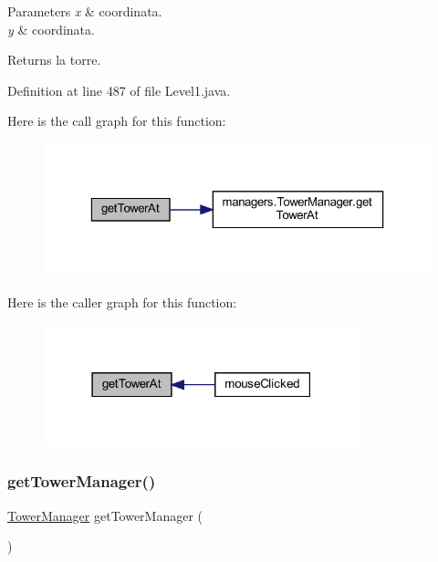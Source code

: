 \begin{DoxyParams}{Parameters}
{\em x} & coordinata. \\
\hline
{\em y} & coordinata.\\
\hline
\end{DoxyParams}
\begin{DoxyReturn}{Returns}
la torre. 
\end{DoxyReturn}


Definition at line 487 of file Level1.\+java.

Here is the call graph for this function\+:\nopagebreak
\begin{figure}[H]
\begin{center}
\leavevmode
\includegraphics[width=323pt]{classscenes_1_1_level1_a4345f2e80059788e5ab1dd1cf0ff2c04_cgraph}
\end{center}
\end{figure}
Here is the caller graph for this function\+:\nopagebreak
\begin{figure}[H]
\begin{center}
\leavevmode
\includegraphics[width=259pt]{classscenes_1_1_level1_a4345f2e80059788e5ab1dd1cf0ff2c04_icgraph}
\end{center}
\end{figure}
\mbox{\label{classscenes_1_1_level1_a6fff8a01141127e3c2897a077e5dee92}} 
\subsubsection{\texorpdfstring{get\+Tower\+Manager()}{getTowerManager()}}
{\footnotesize\ttfamily \hyperlink{classmanagers_1_1_tower_manager}{Tower\+Manager} get\+Tower\+Manager (\begin{DoxyParamCaption}{ }\end{DoxyParamCaption})}



